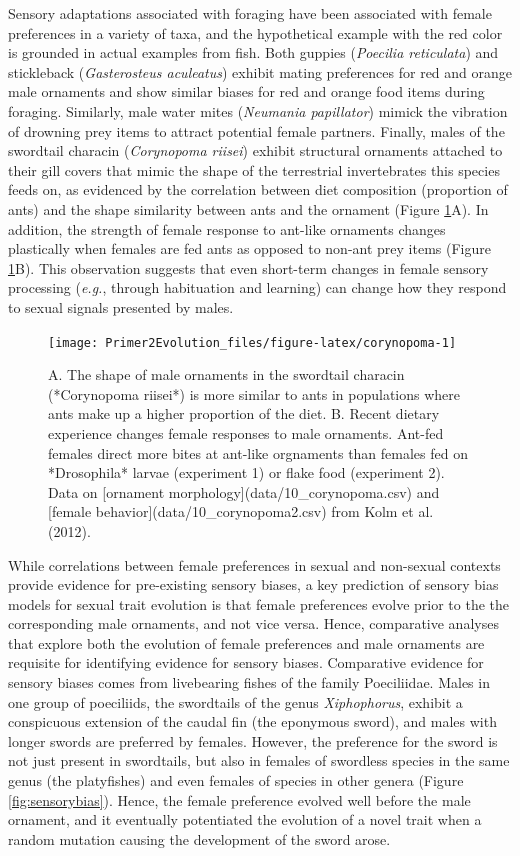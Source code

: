 \documentclass[
]{book}
\begin{document}
Sensory adaptations associated with foraging have been associated with female preferences in a variety of taxa, and the hypothetical example with the red color is grounded in actual examples from fish. Both guppies (\emph{Poecilia reticulata}) and stickleback (\emph{Gasterosteus aculeatus}) exhibit mating preferences for red and orange male ornaments and show similar biases for red and orange food items during foraging. Similarly, male water mites (\emph{Neumania papillator}) mimick the vibration of drowning prey items to attract potential female partners. Finally, males of the swordtail characin (\emph{Corynopoma riisei}) exhibit structural ornaments attached to their gill covers that mimic the shape of the terrestrial invertebrates this species feeds on, as evidenced by the correlation between diet composition (proportion of ants) and the shape similarity between ants and the ornament (Figure \ref{fig:corynopoma}A). In addition, the strength of female response to ant-like ornaments changes plastically when females are fed ants as opposed to non-ant prey items (Figure \ref{fig:corynopoma}B). This observation suggests that even short-term changes in female sensory processing (\emph{e.g.}, through habituation and learning) can change how they respond to sexual signals presented by males.

\begin{figure}
\texttt{[image: Primer2Evolution\_files/figure-latex/corynopoma-1]} \caption{A. The shape of male ornaments in the swordtail characin (*Corynopoma riisei*) is more similar to ants in populations where ants make up a higher proportion of the diet. B. Recent dietary experience changes female responses to male ornaments. Ant-fed females direct more bites  at ant-like orgnaments than females fed on *Drosophila* larvae (experiment 1) or flake food (experiment 2). Data on [ornament morphology](data/10_corynopoma.csv) and [female behavior](data/10_corynopoma2.csv) from Kolm et al. (2012).}\label{fig:corynopoma}
\end{figure}

While correlations between female preferences in sexual and non-sexual contexts provide evidence for pre-existing sensory biases, a key prediction of sensory bias models for sexual trait evolution is that female preferences evolve prior to the the corresponding male ornaments, and not vice versa. Hence, comparative analyses that explore both the evolution of female preferences and male ornaments are requisite for identifying evidence for sensory biases. Comparative evidence for sensory biases comes from livebearing fishes of the family Poeciliidae. Males in one group of poeciliids, the swordtails of the genus \emph{Xiphophorus}, exhibit a conspicuous extension of the caudal fin (the eponymous sword), and males with longer swords are preferred by females. However, the preference for the sword is not just present in swordtails, but also in females of swordless species in the same genus (the platyfishes) and even females of species in other genera (Figure \ref{fig:sensorybias}). Hence, the female preference evolved well before the male ornament, and it eventually potentiated the evolution of a novel trait when a random mutation causing the development of the sword arose.
\end{document}
